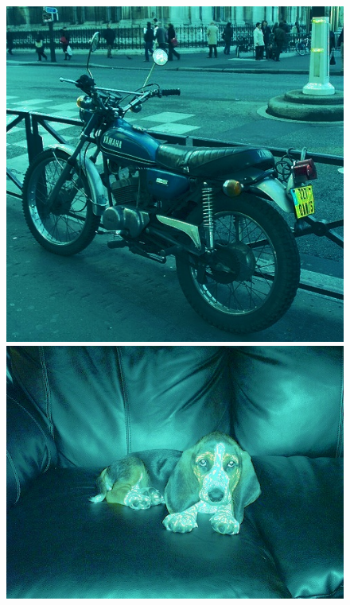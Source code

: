 \begin{appendices}
\begin{figure}[htb]
\begin{minipage}{0.19\textwidth}
\includegraphics[width=\textwidth]{images/anomalien/HS/007911.jpg}
\end{minipage}
\begin{minipage}{0.19\textwidth}
\includegraphics[width=\textwidth]{images/anomalien/HS/007935.jpg}
\end{minipage}
\begin{minipage}{0.19\textwidth}

\end{minipage}
\end{figure}
\end{appendices}
